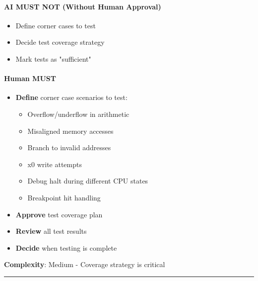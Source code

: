 \paragraph{\texorpdfstring{\warn{} AI MUST NOT (Without Human
Approval)}{ AI MUST NOT (Without Human Approval)}}\label{cr:status:phase1-ai-human-responsibilities:warning-ai-must-not-without-human-approval-11}

\begin{record}

\begin{itemize}
\tightlist
\item
  Define corner cases to test
\item
  Decide test coverage strategy
\item
  Mark tests as "sufficient"
\end{itemize}

\end{record}

\paragraph{\texorpdfstring{\hold{} Human MUST}{ Human MUST}}\label{cr:status:phase1-ai-human-responsibilities:raised-hand-human-must-11}

\begin{record}

\begin{itemize}
\tightlist
\item
  \textbf{Define} corner case scenarios to test:

  \begin{itemize}
  \tightlist
  \item
    Overflow/\allowbreak{}underflow in arithmetic
  \item
    Misaligned memory accesses
  \item
    Branch to invalid addresses
  \item
    x0 write attempts
  \item
    Debug halt during different CPU states
  \item
    Breakpoint hit handling
  \end{itemize}
\item
  \textbf{Approve} test coverage plan
\item
  \textbf{Review} all test results
\item
  \textbf{Decide} when testing is complete
\end{itemize}

\textbf{Complexity}: \partialmark{} Medium - Coverage strategy is
critical

\begin{center}\rule{0.5\linewidth}{0.5pt}\end{center}

\end{record}


